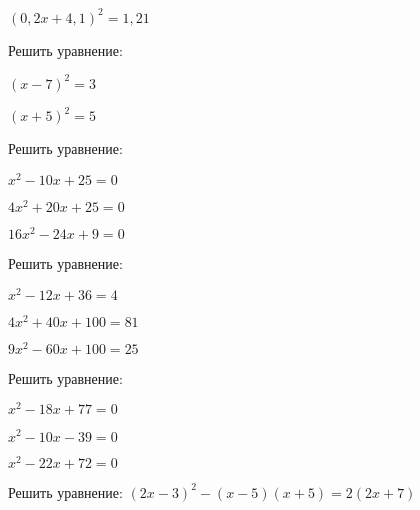 \begin{class}[number=1]
\begin{listofex}
\begin{enumcols}[itemcolumns=3]
			\item \( (0,2x+4,1)^2=1,21 \)
		\end{enumcols}
		\item Решить уравнение:
		\begin{enumcols}[itemcolumns=2]
			\item \( (x-7)^2=3 \)
			\item \( (x+5)^2=5 \)
		\end{enumcols}
		\item Решить уравнение:
		\begin{enumcols}[itemcolumns=3]
			\item \( x^2-10x+25=0 \)
			\item \( 4x^2+20x+25=0 \)
			\item \( 16x^2-24x+9=0 \)
		\end{enumcols}
		\item Решить уравнение:
		\begin{enumcols}[itemcolumns=3]
			\item \( x^2-12x+36=4 \)
			\item \( 4x^2+40x+100=81 \)
			\item \( 9x^2-60x+100=25 \)
		\end{enumcols}
		\item Решить уравнение:
		\begin{enumcols}[itemcolumns=3]
			\item \( x^2-18x+77=0 \)
			\item \( x^2-10x-39=0 \)
			\item \( x^2-22x+72=0 \)
		\end{enumcols}
		\item Решить уравнение: \( (2x-3)^2-(x-5)(x+5)=2(2x+7) \)
	\end{listofex}
\end{class}
%
%
